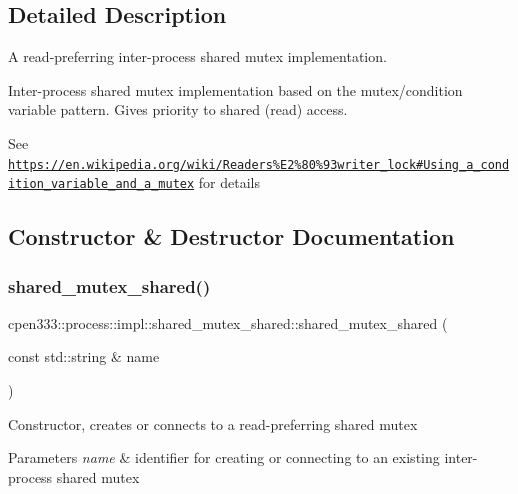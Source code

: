 \subsection{Detailed Description}
A read-\/preferring inter-\/process shared mutex implementation. 

Inter-\/process shared mutex implementation based on the mutex/condition variable pattern. Gives priority to shared (read) access.

See \href{https://en.wikipedia.org/wiki/Readers%E2%80%93writer_lock#Using_a_condition_variable_and_a_mutex}{\tt https\+://en.\+wikipedia.\+org/wiki/\+Readers\%\+E2\%80\%93writer\+\_\+lock\#\+Using\+\_\+a\+\_\+condition\+\_\+variable\+\_\+and\+\_\+a\+\_\+mutex} for details 

\subsection{Constructor \& Destructor Documentation}
\mbox{\label{classcpen333_1_1process_1_1impl_1_1shared__mutex__shared_aa94fee843eb846e57c4ac51589172849}} 
\subsubsection{\texorpdfstring{shared\+\_\+mutex\+\_\+shared()}{shared\_mutex\_shared()}}
{\footnotesize\ttfamily cpen333\+::process\+::impl\+::shared\+\_\+mutex\+\_\+shared\+::shared\+\_\+mutex\+\_\+shared (\begin{DoxyParamCaption}\item[{const std\+::string \&}]{name }\end{DoxyParamCaption})\hspace{0.3cm}{\ttfamily [inline]}}

Constructor, creates or connects to a read-\/preferring shared mutex 
\begin{DoxyParams}{Parameters}
{\em name} & identifier for creating or connecting to an existing inter-\/process shared mutex \\
\hline
\end{DoxyParams}


